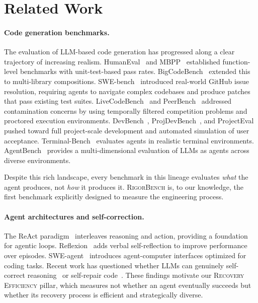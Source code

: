 \documentclass[letterpaper, 10 pt, conference]{ieeeconf}
\newcommand{\bench}{\textsc{RigorBench}}
\newcommand{\pillar}[1]{\textsc{#1}}
\begin{document}
\section{Related Work}
\label{sec:related}

\paragraph{Code generation benchmarks.}
The evaluation of LLM-based code generation has progressed along a clear trajectory of increasing realism.
HumanEval~\cite{chen2021evaluating} and MBPP~\cite{austin2021program} established function-level benchmarks with unit-test-based pass rates.
BigCodeBench~\cite{zhuo2024bigcodebench} extended this to multi-library compositions.
SWE-bench~\cite{jimenez2024swebench} introduced real-world GitHub issue resolution, requiring agents to navigate complex codebases and produce patches that pass existing test suites.
LiveCodeBench~\cite{jain2024livecodebench} and PeerBench~\cite{cheng2025peerbench} addressed contamination concerns by using temporally filtered competition problems and proctored execution environments.
DevBench~\cite{li2024devbench}, ProjDevBench~\cite{zhang2024projdevbench}, and ProjectEval~\cite{liu2025projecteval} pushed toward full project-scale development and automated simulation of user acceptance.
Terminal-Bench~\cite{xie2024terminalbench} evaluates agents in realistic terminal environments.
AgentBench~\cite{liu2023agentbench} provides a multi-dimensional evaluation of LLMs as agents across diverse environments.

Despite this rich landscape, every benchmark in this lineage evaluates \emph{what} the agent produces, not \emph{how} it produces it.
\bench{} is, to our knowledge, the first benchmark explicitly designed to measure the engineering process.

\paragraph{Agent architectures and self-correction.}
The ReAct paradigm~\cite{yao2023react} interleaves reasoning and action, providing a foundation for agentic loops.
Reflexion~\cite{shinn2023reflexion} adds verbal self-reflection to improve performance over episodes.
SWE-agent~\cite{yang2024sweagenttool} introduces agent-computer interfaces optimized for coding tasks.
Recent work has questioned whether LLMs can genuinely self-correct reasoning~\cite{huang2024large} or self-repair code~\cite{olausson2024selfrepair}.
These findings motivate our \pillar{Recovery Efficiency} pillar, which measures not whether an agent eventually succeeds but whether its recovery process is efficient and strategically diverse.
\end{document}
